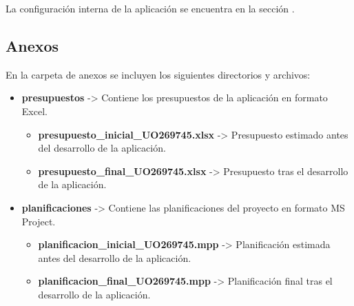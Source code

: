 La configuración interna de la aplicación se encuentra en la sección .

\subsection*{Anexos}
En la carpeta de anexos se incluyen los siguientes directorios y archivos:
 
\begin{itemize}
    \item \textbf{presupuestos} -> Contiene los presupuestos de la aplicación en formato Excel.
    \begin{itemize}
        \item \textbf{presupuesto\_inicial\_UO269745.xlsx} -> Presupuesto estimado antes del desarrollo de la aplicación.
        \item \textbf{presupuesto\_final\_UO269745.xlsx} -> Presupuesto tras el desarrollo de la aplicación.
    \end{itemize}
    \item \textbf{planificaciones} -> Contiene las planificaciones del proyecto en formato MS Project.
    \begin{itemize}
        \item \textbf{planificacion\_inicial\_UO269745.mpp} -> Planificación estimada antes del desarrollo de la aplicación.
        \item \textbf{planificacion\_final\_UO269745.mpp} -> Planificación final tras el desarrollo de la aplicación.
    \end{itemize}
\end{itemize}
